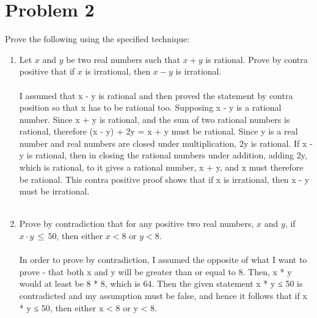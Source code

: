 \documentclass{amsart}
\theoremstyle{definition}
\theoremstyle{Exercise}
\theoremstyle{remark}
\theoremstyle{rule}
\numberwithin{equation}{section}
\begin{document}
  \section*{Problem 2}
  Prove the following using the specified technique:
  \begin{enumerate}[label=(\alph*)]
    \item Let $x$ and $y$ be two real numbers such that $x + y$ is rational. Prove by contra positive that if $x$ is irrational, then $x - y$ is irrational.
          \\\\
I assumed that x - y is rational and then proved the statement by contra position so that x has to be rational too. Supposing x - y is a rational number. Since x + y is rational, and the sum of two rational numbers is rational, therefore (x - y) + 2y = x + y must be rational. Since y is a real number and real numbers are closed under multiplication, 2y is rational. If x - y is rational, then in closing the rational numbers under addition, adding 2y, which is rational, to it gives a rational number, x + y, and x must therefore be rational. This contra positive proof shows that if x is irrational, then x - y must be irrational.
\\\\
    \item Prove by contradiction that for any positive two real numbers, $x$ and $y$,
         if $x\cdot y\, \leq \,50$, then either $x < 8$ or $y < 8$.
          \\\\
In order to prove by contradiction, I assumed the opposite of what I want to prove - that both x and y will be greater than or equal to 8. Then, x * y would at least be 8 * 8, which is 64. Then the given statement x * y ≤ 50 is contradicted and my assumption must be false, and hence it follows that if x * y ≤ 50, then either x < 8 or y < 8.
\\\\
  \end{enumerate}
  \newpage
  \section*{}
  \section*{}
\end{document}
